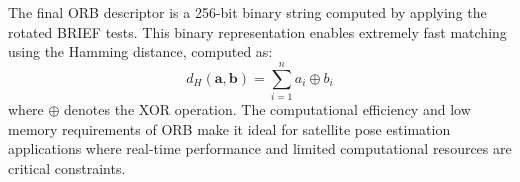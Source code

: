 The final ORB descriptor is a 256-bit binary string computed by applying the rotated BRIEF tests. This binary representation 
enables extremely fast matching using the Hamming distance, computed as:
\begin{equation}
d_H(\mathbf{a}, \mathbf{b}) = \sum_{i=1}^{n} a_i \oplus b_i
\end{equation}
where $\oplus$ denotes the XOR operation. The computational efficiency and low memory requirements of ORB make it ideal for satellite 
pose estimation applications where real-time performance and limited computational resources are critical constraints.








